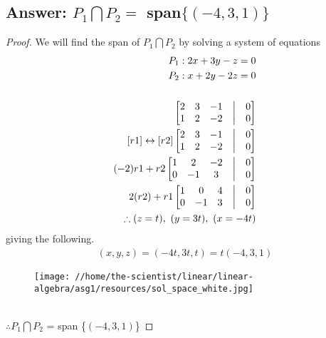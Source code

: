 \documentclass[12pt]{article}
\begin{document}
\subsection{Answer: $P_1 \bigcap P_2 =$ span$\{(-4, 3, 1)\}$}
\begin{proof}
        We will find the span of $P_1 \bigcap P_2$ by solving a system of equations
        \begin{align*}
                P_{1}: 2x+3y-z = 0         \\
                P_{2}: x+2y-2z = 0         \\\\
                \begin{bmatrix}
                        2 & 3 & -1 & \bigm| & 0 \\
                        1 & 2 & -2 & \bigm| & 0 \\
                \end{bmatrix}
                \\
                [r1] \leftrightarrow  [r2]
                \begin{bmatrix}
                        2 & 3 & -1 & \bigm| & 0 \\
                        1 & 2 & -2 & \bigm| & 0 \\
                \end{bmatrix}
                \\
                (-2)r1+r2
                \begin{bmatrix}
                        1 & 2  & -2 & \bigm| & 0 \\
                        0 & -1 & 3  & \bigm| & 0 \\
                \end{bmatrix}
                \\
                2(r2)+r1
                \begin{bmatrix}
                        1 & 0  & 4 & \bigm| & 0 \\
                        0 & -1 & 3 & \bigm| & 0 \\
                \end{bmatrix} \\
                \therefore (z=t),\ (y=3t),\ (x=-4t)
        \end{align*}
        giving the following.
        \begin{align*}
                (x,y,z) = (-4t, 3t, t) = t(-4, 3, 1)
        \end{align*}
        \begin{figure}[htbp]
                \centering
                \texttt{[image: //home/the-scientist/linear/linear-algebra/asg1/resources/sol\_space\_white.jpg]}
        \end{figure}
        \\$\therefore P_1 \bigcap P_2$ = span \{$(-4, 3, 1)$\}
\end{proof}
\end{document}
